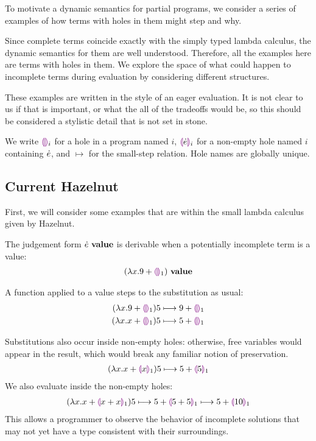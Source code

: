 To motivate a dynamic semantics for partial programs, we consider a series
of examples of how terms with holes in them might step and why.

Since complete terms coincide exactly with the simply typed lambda
calculus, the dynamic semantics for them are well understood. Therefore,
all the examples here are terms with holes in them. We explore the space of
what could happen to incomplete terms during evaluation by considering
different structures.

These examples are written in the style of an eager evaluation. It is not
clear to us if that is important, or what the all of the tradeoffs would
be, so this should be considered a stylistic detail that is not set in
stone.

We write $\textcolor{violet}{\llparenthesis}\textcolor{violet}{\rrparenthesis}_i$ for a hole in a program named $i$, $\textcolor{violet}{\llparenthesis}\dot{e}\textcolor{violet}{\rrparenthesis}_i$
for a non-empty hole named $i$ containing $\dot{e}$, and $\mapsto$ for the
small-step relation. Hole names are globally unique.

\subsection{Current Hazelnut}
First, we will consider some examples that are within the small lambda
calculus given by Hazelnut.

The judgement form ${\dot{e}} ~\mathbf{value}$ is derivable when a potentially
incomplete term is a value:
\begin{align*}
  {(\lambda x. 9 + \textcolor{violet}{\llparenthesis}\textcolor{violet}{\rrparenthesis}_1)} ~\mathbf{value}
\end{align*}

A function applied to a value steps to the substitution as usual:
\begin{align*}
  {
        (\lambda x.9 + \textcolor{violet}{\llparenthesis}\textcolor{violet}{\rrparenthesis}_1)5
      } \longmapsto {
        9 + \textcolor{violet}{\llparenthesis}\textcolor{violet}{\rrparenthesis}_1
      }
      \\
      {
        (\lambda x.x + \textcolor{violet}{\llparenthesis}\textcolor{violet}{\rrparenthesis}_1)5
      } \longmapsto {
        5 + \textcolor{violet}{\llparenthesis}\textcolor{violet}{\rrparenthesis}_1
      }
\end{align*}

Substitutions also occur inside non-empty holes: otherwise, free variables
would appear in the result, which would break any familiar notion of
preservation.
\begin{align*}
  {
        (\lambda x.x + \textcolor{violet}{\llparenthesis}x\textcolor{violet}{\rrparenthesis}_1)5
      } \longmapsto {
        5 + \textcolor{violet}{\llparenthesis}5\textcolor{violet}{\rrparenthesis}_1
      }
\end{align*}
We also evaluate inside the non-empty holes:
\begin{align*}
  {
    {
          (\lambda x.x + \textcolor{violet}{\llparenthesis}x + x\textcolor{violet}{\rrparenthesis}_1)5
        } \longmapsto {
          5 + \textcolor{violet}{\llparenthesis}5 + 5\textcolor{violet}{\rrparenthesis}_1
        }
  } \longmapsto {5 + \textcolor{violet}{\llparenthesis}10\textcolor{violet}{\rrparenthesis}_1}
\end{align*}
This allows a programmer to observe the behavior of incomplete solutions
that may not yet have a type consistent with their surroundings.

